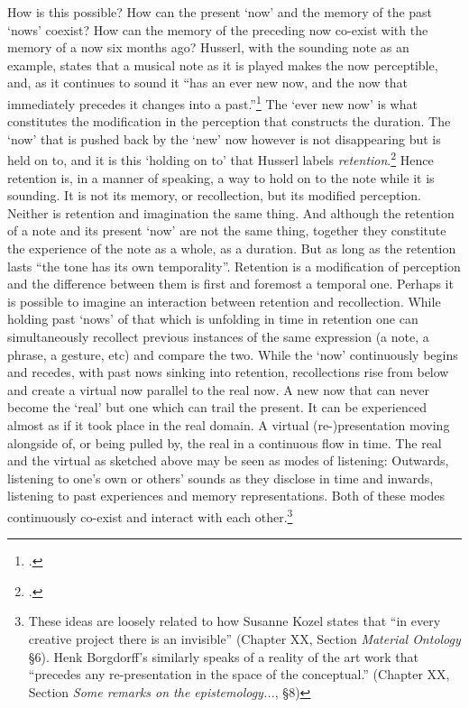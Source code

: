 How is this possible? How can the present `now' and the memory of the past `nows' coexist? How can the memory of the preceding now co-exist with the memory of a now six months ago? Husserl, with the sounding note as an example, states that a musical note as it is played makes the now perceptible, and, as it continues to sound it ``has an ever new now, and the now that immediately precedes it changes into a past.''\footcite[\emph{Vorlesungen zur Phänomenologi des inneren Zeitbewussteins}, Husserl, E. cited in][32]{ricoeur04} The `ever new now' is what constitutes the modification in the perception that constructs the duration. The `now' that is pushed back by the `new' now however is not disappearing but is held on to, and it is this `holding on to' that Husserl labels \emph{retention}.\footcite[32]{ricoeur04} Hence retention is, in a manner of speaking, a way to hold on to the note while it is sounding. It is not its memory, or recollection, but its modified perception. Neither is retention and imagination the same thing. And although the retention of a note and its present `now' are not the same thing, together they constitute the experience of the note as a whole, as a duration. But as long as the retention lasts ``the tone has its own temporality''. Retention is a modification of perception and the difference between them is first and foremost a temporal one. Perhaps it is possible to imagine an interaction between retention and  recollection. While holding past `nows' of that which is unfolding in time in retention one can simultaneously recollect previous instances of the same expression (a note, a phrase, a gesture, etc) and compare the two. While the `now' continuously begins and recedes, with past nows sinking into retention, recollections rise from below and create a virtual now parallel to the real now. A new now that can never become the `real' but one which can trail the present. It can be experienced almost as if it took place in the real domain. A virtual (re-)presentation moving alongside of, or being pulled by, the real in a continuous flow in time. The real and the virtual as sketched above may be seen as modes of listening: Outwards, listening to one's own or others' sounds as they disclose in time and inwards, listening to past experiences and memory representations. Both of these modes continuously co-exist and interact with each other.\footnote{These ideas are loosely related to how Susanne Kozel states that ``in every creative project there is an invisible'' (Chapter XX, Section \emph{Material Ontology} \S6). Henk Borgdorff's similarly speaks of a reality of the art work that ``precedes any re-presentation in the space of the conceptual.'' (Chapter XX, Section \emph{Some remarks on the epistemology...}, \S8)}

